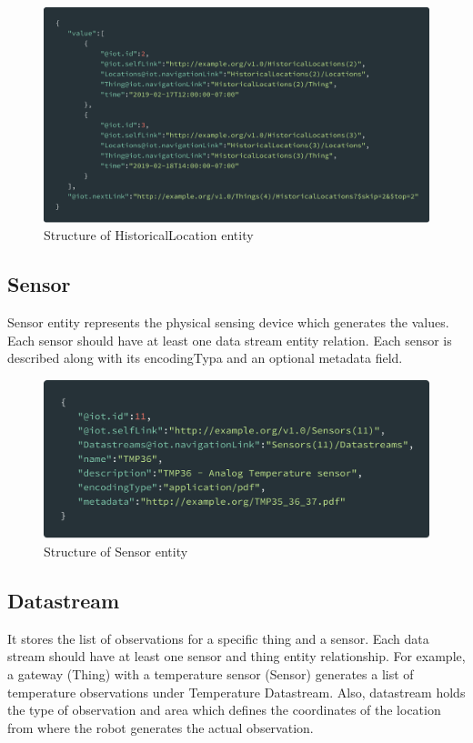 	\begin{figure}[!htbp] 
		\begin{center}
			\includegraphics[scale=0.1]{./images/png/ogc/historical_location}	
			\caption{Structure of HistoricalLocation entity}	
			\label{fig:historical_location}	
		\end{center}
	\end{figure}

	\subsection{Sensor}
	Sensor entity represents the physical sensing device which generates the values. Each sensor should have at least one data stream entity relation. Each sensor is described along with its encodingTypa and an optional metadata field.
	
	\begin{figure}[!htbp] 
		\begin{center}
			\includegraphics[scale=0.1]{./images/png/ogc/sensor}	
			\caption{Structure of Sensor entity}	
			\label{fig:sensor}	
		\end{center}
	\end{figure}
	
	\subsection{Datastream}
	 It stores the list of observations for a specific thing and a sensor. Each data stream should have at least one sensor and thing entity relationship. For example, a gateway (Thing) with a temperature sensor (Sensor) generates a list of temperature observations under Temperature Datastream.  Also, datastream holds the type of observation and area which defines the coordinates of the location from where the robot generates the actual observation.
	
